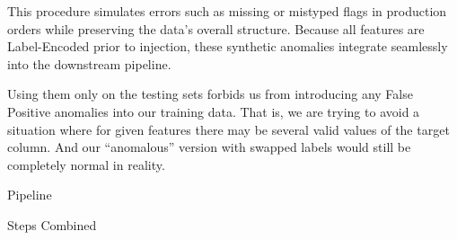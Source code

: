 This procedure simulates errors such as missing or mistyped flags in production orders while preserving the data’s overall structure. Because all features are Label-Encoded prior to injection, these synthetic anomalies integrate seamlessly into the downstream pipeline.

Using them only on the testing sets forbids us from introducing any False Positive anomalies into our training data. That is, we are trying to avoid a situation where for given features there may be several valid values of the target column. And our ``anomalous'' version with swapped labels would still be completely normal in reality.

\secc Pipeline

\secc Steps Combined